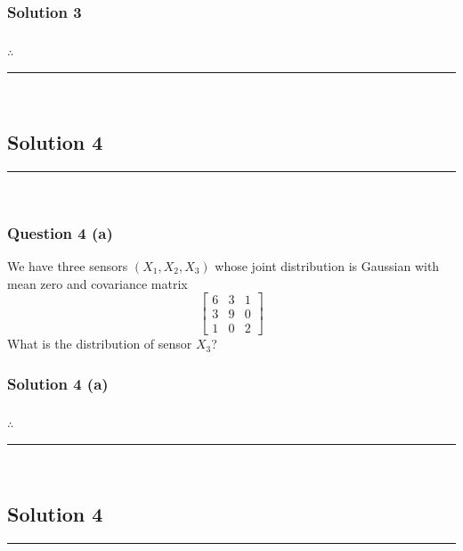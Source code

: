 \documentclass{article}
\begin{document}
\subsubsection*{Solution 3}


\subsubsection*{\normalfont}{$\therefore$ }

\noindent\rule{\textwidth}{0.4pt}\\

\newpage

\subsection*{Solution 4}
\noindent\rule{\textwidth}{0.4pt}\\
\subsubsection*{Question 4 (a)}
\begin{flushleft}
    We have three sensors $(X_1, X_2, X_3)$ whose joint distribution is Gaussian with mean zero and covariance matrix 
    \[
    \begin{bmatrix}
    6 & 3 & 1 \\
    3 & 9 & 0 \\
    1 & 0 & 2
    \end{bmatrix}
    \]
    What is the distribution of sensor $X_3$? 
\end{flushleft}

\subsubsection*{Solution 4 (a)}


\subsubsection*{\normalfont}{$\therefore$ }

\noindent\rule{\textwidth}{0.4pt}\\

\newpage

\subsection*{Solution 4}
\noindent\rule{\textwidth}{0.4pt}\\
\end{document}
